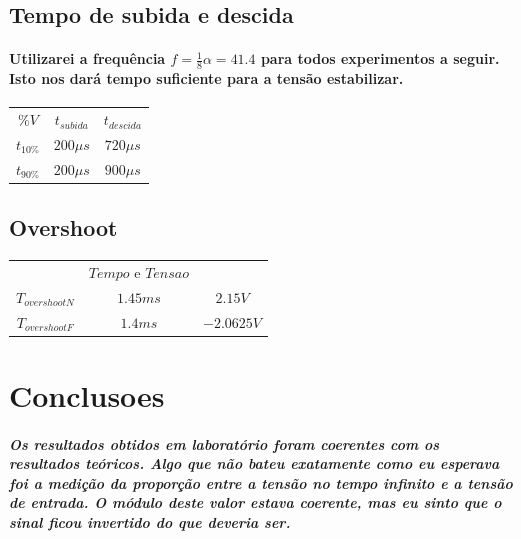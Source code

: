 \documentclass[12pt,twoside, a4paper, twocolumn]{article}
\begin{document}
\subsection{Tempo de subida e descida}

\paragraph*{Utilizarei a frequência $f = \frac{1}{8} \alpha = 41.4$ para todos experimentos a seguir. Isto nos dará tempo suficiente para a tensão estabilizar.}

\begin{center}
    \begin{tabular}{ |ccc| }
        \hline
        $\%V$      & $t_{subida}$ & $t_{descida}$ \\
        $t_{10\%}$ & $200\mu s$   & $720 \mu s$   \\
        $t_{90\%}$ & $200\mu s$   & $900 \mu s$   \\
        \hline
    \end{tabular}
\end{center}

\subsection{Overshoot}

\begin{center}
    \begin{tabular}{ |ccc| }
        \hline
        $\,$             & $Tempo$  e $Tensao$              \\
        $T_{overshootN}$ & $1.45ms$            & $2.15V$    \\
        $T_{overshootF}$ & $1.4ms$             & $-2.0625V$ \\
        \hline
    \end{tabular}
\end{center}

\section{Conclusoes}

\subparagraph*{Os resultados obtidos em laboratório foram coerentes com os resultados teóricos. Algo que não bateu exatamente como eu esperava foi a medição da proporção entre a tensão no tempo infinito e a tensão de entrada. O módulo deste valor estava coerente, mas eu sinto que o sinal ficou invertido do que deveria ser.}
\end{document}
